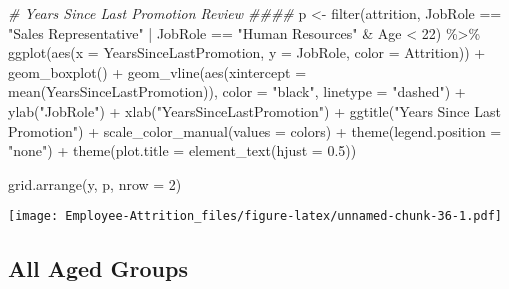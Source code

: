 \documentclass[
]{article}
\newenvironment{Shaded}{\begin{snugshade}}{\end{snugshade}}
\newcommand{\AttributeTok}[1]{\textcolor[rgb]{0.77,0.63,0.00}{#1}}
\newcommand{\CommentTok}[1]{\textcolor[rgb]{0.56,0.35,0.01}{\textit{#1}}}
\newcommand{\DecValTok}[1]{\textcolor[rgb]{0.00,0.00,0.81}{#1}}
\newcommand{\FloatTok}[1]{\textcolor[rgb]{0.00,0.00,0.81}{#1}}
\newcommand{\FunctionTok}[1]{\textcolor[rgb]{0.00,0.00,0.00}{#1}}
\newcommand{\NormalTok}[1]{#1}
\newcommand{\OtherTok}[1]{\textcolor[rgb]{0.56,0.35,0.01}{#1}}
\newcommand{\SpecialCharTok}[1]{\textcolor[rgb]{0.00,0.00,0.00}{#1}}
\newcommand{\StringTok}[1]{\textcolor[rgb]{0.31,0.60,0.02}{#1}}
\begin{document}
\begin{Shaded}
\begin{Highlighting}[]
\CommentTok{\# Years Since Last Promotion Review \#\#\#\#}
\NormalTok{p }\OtherTok{\textless{}{-}} \FunctionTok{filter}\NormalTok{(attrition, JobRole }\SpecialCharTok{==} \StringTok{"Sales Representative"} \SpecialCharTok{|}\NormalTok{ JobRole }\SpecialCharTok{==} \StringTok{"Human Resources"} \SpecialCharTok{\&}\NormalTok{ Age }\SpecialCharTok{\textless{}} \DecValTok{22}\NormalTok{) }\SpecialCharTok{\%\textgreater{}\%}
  \FunctionTok{ggplot}\NormalTok{(}\FunctionTok{aes}\NormalTok{(}\AttributeTok{x =}\NormalTok{ YearsSinceLastPromotion, }\AttributeTok{y =}\NormalTok{ JobRole, }\AttributeTok{color =}\NormalTok{ Attrition)) }\SpecialCharTok{+}
  \FunctionTok{geom\_boxplot}\NormalTok{() }\SpecialCharTok{+}
  \FunctionTok{geom\_vline}\NormalTok{(}\FunctionTok{aes}\NormalTok{(}\AttributeTok{xintercept =} \FunctionTok{mean}\NormalTok{(YearsSinceLastPromotion)), }\AttributeTok{color =} \StringTok{"black"}\NormalTok{, }\AttributeTok{linetype =} \StringTok{"dashed"}\NormalTok{) }\SpecialCharTok{+}
  \FunctionTok{ylab}\NormalTok{(}\StringTok{"JobRole"}\NormalTok{) }\SpecialCharTok{+}
  \FunctionTok{xlab}\NormalTok{(}\StringTok{"YearsSinceLastPromotion"}\NormalTok{) }\SpecialCharTok{+}
  \FunctionTok{ggtitle}\NormalTok{(}\StringTok{"Years Since Last Promotion"}\NormalTok{) }\SpecialCharTok{+}
  \FunctionTok{scale\_color\_manual}\NormalTok{(}\AttributeTok{values =}\NormalTok{ colors) }\SpecialCharTok{+}
  \FunctionTok{theme}\NormalTok{(}\AttributeTok{legend.position =} \StringTok{"none"}\NormalTok{) }\SpecialCharTok{+}
  \FunctionTok{theme}\NormalTok{(}\AttributeTok{plot.title =} \FunctionTok{element\_text}\NormalTok{(}\AttributeTok{hjust =} \FloatTok{0.5}\NormalTok{)) }


\FunctionTok{grid.arrange}\NormalTok{(y, p, }\AttributeTok{nrow =} \DecValTok{2}\NormalTok{)}
\end{Highlighting}
\end{Shaded}

\texttt{[image: Employee-Attrition\_files/figure-latex/unnamed-chunk-36-1.pdf]}

\hypertarget{all-aged-groups}{%
\subsection{All Aged Groups}\label{all-aged-groups}}
\end{document}
